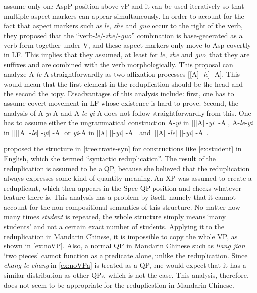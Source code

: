 \documentclass[
a4paper,
10pt,
oneside,
]{scrartcl}
\begin{document}
\citet{Huangetal2009} assume only one AspP position above vP and it can be used iteratively so that
multiple aspect markers can appear simultaneously. In order to account for the fact that aspect
markers such as \emph{le}, \emph{zhe} and \emph{guo} occur to the right of the verb, they proposed
that the ``verb-\emph{le}/-\emph{zhe}/-\emph{guo}'' combination is base-generated as a verb form
together under V, and these aspect markers only move to Asp covertly in LF. This implies that they
assumed, at least for \emph{le}, \emph{zhe} and \emph{guo},  that they are suffixes and are combined
with the verb morphologically. This proposal can analyze A-\emph{le}-A straightforwardly as two
affixation processes [[A] -\emph{le}] -A]. This would mean that the first element in the
reduplication should be the head and the second the copy.  Disadvantages of this analysis include:
first, one has to assume covert movement in LF whose existence is hard to prove. Second, the
analysis of A-\emph{yi}-A and A-\emph{le}-\emph{yi}-A does not follow straightforwardly from
this. One has to assume either the ungrammatical construction A-\emph{yi} in [[[A] -\emph{yi}] -A],
A-\emph{le}-\emph{yi} in [[[[A] -\emph{le}] -\emph{yi}] -A] or \emph{yi}-A in [[A] [[-\emph{yi}]
-A]] and [[[A] -\emph{le}] [[-\emph{yi}] -A]]. 






\citet{Travis2001-short, Travis2003} proposed the structure in \ref{tree:travis-syn} for
constructions like \ref{ex:student} in English, which she termed ``syntactic reduplication''. The
result of the reduplication is assumed to be a QP, because she believed that the reduplication
always expresses some kind of quantity meaning. An XP was assumed to create a reduplicant, which
then appears in the Spec-QP position and checks whatever feature there is. This analysis has a
problem by itself, namely that it cannot account for the non-compositional semantics of this
structure. No matter how many times \emph{student} is repeated, the whole structure simply means
`many students' and not a certain exact number of students. Applying it to the reduplication in
Mandarin Chinese, it is impossible to copy the whole VP, as shown in \ref{ex:noVP}. Also, a normal
QP in Mandarin Chinese such as \emph{liang jian} `two pieces' cannot function as a predicate alone,
unlike the reduplication. Since \emph{chang le chang} in \ref{ex:noVPa} is treated as a QP, one
would expect that it has a similar distribution as other QPs, which is not the case. This analysis,
therefore, does not seem to be appropriate for the reduplication in Mandarin Chinese. 
\end{document}
